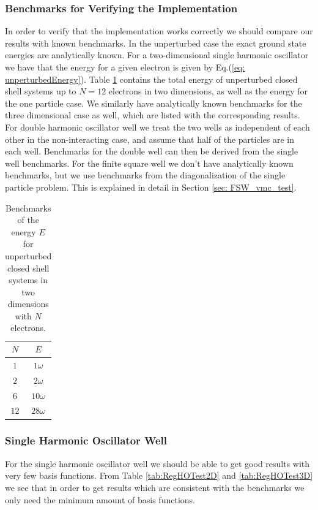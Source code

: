 \documentclass[../main.tex]{subfiles}
\begin{document}
\subsubsection{Benchmarks for Verifying the Implementation}
In order to verify that the implementation works correctly we should compare our results with known benchmarks. In the unperturbed case the exact ground state energies are analytically known. For a two-dimensional single harmonic oscillator we have that the energy for a given electron is given by Eq.(\ref{eq: unperturbedEnergy}). Table \ref{tab: unperturbedEnergies} contains the total energy of unperturbed closed shell systems up to $N=12$ electrons in two dimensions, as well as the energy for the one particle case. We similarly have analytically known benchmarks for the three dimensional case as well, which are listed with the corresponding results. For double harmonic oscillator well we treat the two wells as independent of each other in the non-interacting case, and assume that half of the particles are in each well. Benchmarks for the double well can then be derived from the single well benchmarks. For the finite square well we don't have analytically known benchmarks, but we use benchmarks from the diagonalization of the single particle problem. This is explained in detail in Section \ref{sec: FSW_vmc_test}.
\begin{table}[!ht]
  \centering
  \begin{tabular}{ | c | c | }
    \hline
     $N$ & $E$ \\*
    \hline
     $1$ & $1\omega$ \\*
    \hline
     $2$ & $2\omega$ \\*
    \hline
     $6$ & $10\omega$ \\*
    \hline
    $12$ & $28\omega$ \\*
    \hline
  \end{tabular}
  \caption{Benchmarks of the energy $E$ for unperturbed closed shell systems in two dimensions with $N$ electrons.}
  \label{tab: unperturbedEnergies}
\end{table}

\subsubsection{Single Harmonic Oscillator Well}\label{sec:testSHO}

For the single harmonic oscillator well we should be able to get good results with very few basis functions. From Table \ref{tab:RegHOTest2D} and \ref{tab:RegHOTest3D} we see that in order to get results which are consistent with the benchmarks we only need the minimum amount of basis functions.
\end{document}
